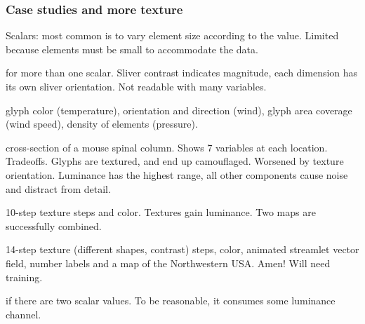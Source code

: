 \begin{mdframed}\begin{multicols}{2}
\subsubsection{Case studies and more texture}
\begin{compactdesc}
    \item[Univariate and multivariate Maps] Scalars: most common is to
        vary element size according to the value. Limited because
        elements must be small to accommodate the data.
    \item[Orientes sliver textures] for more than one scalar.
        Sliver contrast indicates magnitude, each dimension has its own sliver
        orientation. Not readable with many variables.
    \item[Attempt two:] glyph color (temperature), orientation and direction
        (wind), glyph area coverage (wind speed), density of elements
        (pressure).
    \item[3, a Scientist and designer:] cross-section of a mouse spinal column.
        Shows 7 variables at each location. Tradeoffs. Glyphs are textured,
        and end up camouflaged. Worsened by texture orientation.
        Luminance has the highest range, all other components cause noise and
        distract from detail.
    \item[Quantitative texture sequence 1] 10-step texture steps and color.
        Textures gain luminance. Two maps are successfully combined.
    \item[Quantitative texture sequence 2] 14-step texture (different shapes,
        contrast) steps, color, animated streamlet vector field, number labels
        and a map of the Northwestern USA.
        Amen! Will need training.
    \item[Texture is most valuable] if there are two scalar values.
        To be reasonable, it consumes some luminance channel.
\end{compactdesc}
\end{multicols}\end{mdframed}

